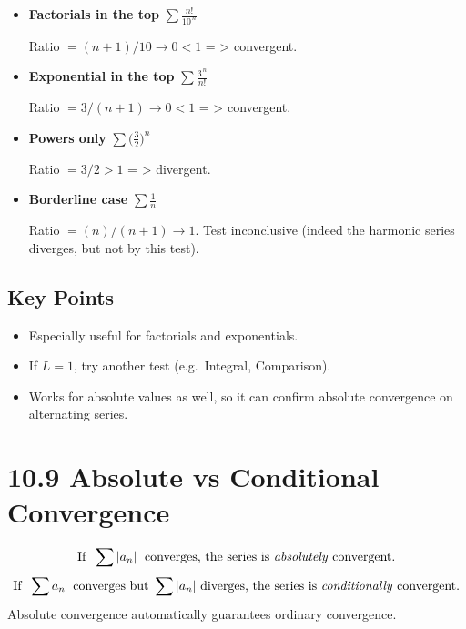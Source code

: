 \documentclass{article}
\begin{document}
\begin{itemize}[itemsep=10pt]

  \item \textbf{Factorials in the top}  
        \(\displaystyle\sum \frac{n!}{10^{\,n}}\)

        Ratio \(= (n+1)/10 \rightarrow 0 < 1\) = > convergent.

  \item \textbf{Exponential in the top}  
        \(\displaystyle\sum \frac{3^{\,n}}{n!}\)

        Ratio \(= 3/(n+1)\rightarrow 0 < 1\) = > convergent.

  \item \textbf{Powers only}  
        \(\displaystyle\sum \bigl(\tfrac{3}{2}\bigr)^{n}\)

        Ratio \(= 3/2 > 1\) = > divergent.

  \item \textbf{Borderline case}  
        \(\displaystyle\sum \frac{1}{n}\)

        Ratio \(= (n)/(n+1)\rightarrow 1\).  Test inconclusive (indeed the harmonic series diverges, but not by this test).

\end{itemize}

\subsection*{Key Points}

\begin{itemize}[itemsep=4pt]
  \item Especially useful for factorials and exponentials.
  \item If \(L=1\), try another test (e.g.\ Integral, Comparison).
  \item Works for absolute values as well, so it can confirm absolute convergence on alternating series.
\end{itemize}

\newpage
\section{10.9 Absolute vs Conditional Convergence}

\begin{tcolorbox}[colback=gray!8,colframe=black,title=Big-Idea]
\[
\text{If }\;\sum |a_n|\;\text{ converges, the series is \emph{absolutely} convergent.}
\]
\[
\text{If }\;\sum a_n\;\text{ converges but }\sum |a_n|\text{ diverges,
the series is \emph{conditionally} convergent.}
\]
Absolute convergence automatically guarantees ordinary convergence.
\end{tcolorbox}
\end{document}
